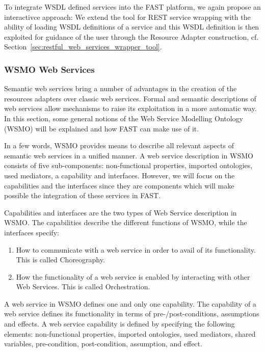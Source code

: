 \documentclass{fast_latex}
\begin{document}
To integrate WSDL defined services into the FAST platform, we again propose an interactivce approach: We extend the tool for REST service wrapping with the ability of loading WSDL definitions of a service and this WSDL definition is then exploited for guidance of the user through the Resource Adapter construction, cf. Section~\ref{sec:restful_web_services_wrapper_tool}.


\subsubsection{WSMO Web Services} %
\label{ssub:wsmo_web_services}

Semantic web services bring a number of advantages in the creation of the resources adapters over classic web services. Formal and semantic descriptions of web services allow mechanisms to raise its exploitation in a more automatic way. In this section, some general notions of the Web Service Modelling Ontology (WSMO) will be explained and how FAST can make use of it.

In a few words, WSMO provides means to describe all relevant aspects of semantic web services in a unified manner. A web service description in WSMO consists of five sub-components: non-functional properties, imported ontologies, used mediators, a capability and interfaces. However, we will focus on the capabilities and the interfaces since they are components which will make possible the integration of these services in FAST.

Capabilities and interfaces are the two types of Web Service description in WSMO. The capabilities describe the different functions of WSMO, while the interfaces specify:
\begin{enumerate}
	\item How to communicate with a web service in order to avail of its functionality. This is called Choreography.
	\item How the functionality of a web service is enabled by interacting with other Web Services. This is called Orchestration.
\end{enumerate}

A web service in WSMO defines one and only one capability. The capability of a web service defines its functionality in terms of pre-/post-conditions, assumptions and effects. A web service capability is defined by specifying the following elements: non-functional properties, imported ontologies, used mediators, shared variables, pre-condition, post-condition, assumption, and effect.
\end{document}
